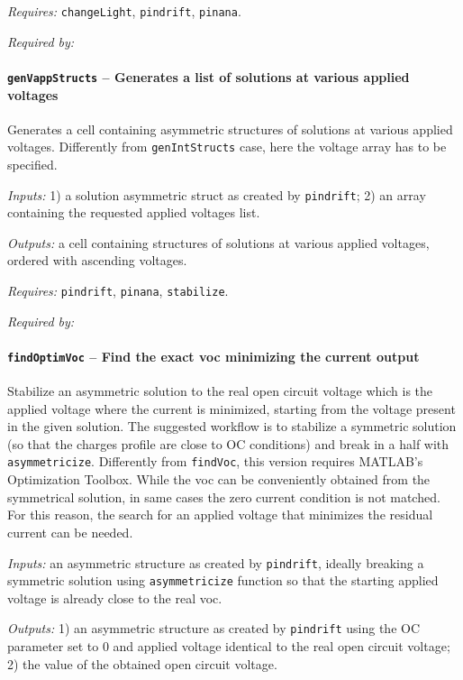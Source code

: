 \textit{Requires:} \texttt{change\-Light}, \texttt{pindrift}, \texttt{pinana}.

\textit{Required by:} 

		\paragraph{\texttt{gen\-Vapp\-Structs} -- Generates a list of solutions at various applied voltages}\label{genVappStructs}
Generates a cell containing asymmetric structures of solutions at various applied voltages.
Differently from \texttt{gen\-Int\-Structs} case, here the voltage array has to be specified.

\textit{Inputs:} 1) a solution asymmetric struct as created by \texttt{pindrift};
2) an array containing the requested applied voltages list.

\textit{Outputs:} a cell containing structures of solutions at various applied
     voltages, ordered with ascending voltages.
     
\textit{Requires:} \texttt{pindrift}, \texttt{pinana}, \texttt{stabilize}.

\textit{Required by:} 

		\paragraph{\texttt{find\-Optim\-Voc} -- Find the exact \gls{voc} minimizing the current output}
Stabilize an asymmetric solution to the real open circuit voltage
which is the applied voltage where the current is minimized,
starting from the voltage present in the given solution. The suggested
workflow is to stabilize a symmetric solution (so that the charges
profile are close to OC conditions) and break in a half with
\texttt{asymmetricize}.
Differently from \texttt{findVoc}, this version requires MATLAB's Optimization Toolbox.
While the \gls{voc} can be conveniently obtained from the symmetrical solution, in same cases the zero current condition is not matched.
For this reason, the search for an applied voltage that minimizes the residual current can be needed.
		
		\textit{Inputs:} an asymmetric structure as created by \texttt{pindrift}, ideally
    breaking a symmetric solution using \texttt{asymmetricize} function so that
    the starting applied voltage is already close to the real \gls{voc}.
    
\textit{Outputs:} 1) an asymmetric structure as created by \texttt{pindrift} using the OC
     parameter set to 0 and applied voltage identical to the real open
     circuit voltage;
2) the value of the obtained open circuit voltage.

